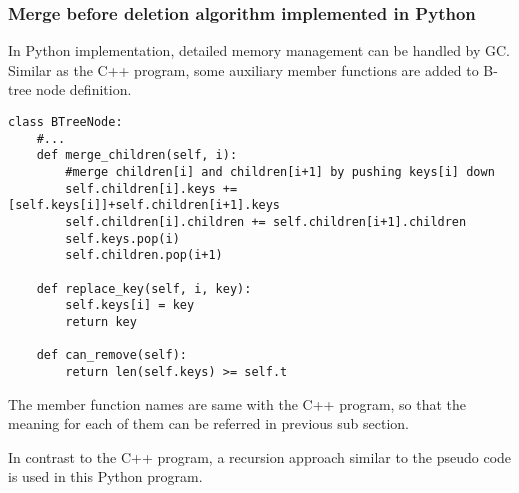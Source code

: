 \documentclass{article}
\begin{document}
\subsubsection{Merge before deletion algorithm implemented in Python}
In Python implementation, detailed memory management can be handled by
GC. Similar as the C++ program, some auxiliary member functions
are added to B-tree node definition.

\lstset{language=Python}
\begin{lstlisting}
class BTreeNode:
    #...
    def merge_children(self, i):
        #merge children[i] and children[i+1] by pushing keys[i] down
        self.children[i].keys += [self.keys[i]]+self.children[i+1].keys
        self.children[i].children += self.children[i+1].children
        self.keys.pop(i)
        self.children.pop(i+1)

    def replace_key(self, i, key):
        self.keys[i] = key
        return key

    def can_remove(self):
        return len(self.keys) >= self.t
\end{lstlisting}

The member function names are same with the C++ program, so that the
meaning for each of them can be referred in previous sub section.

In contrast to the C++ program, a recursion approach similar to the
pseudo code is used in this Python program.
\end{document}
